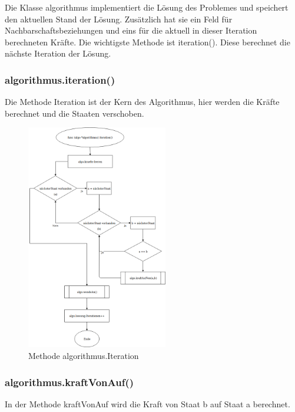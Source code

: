 Die Klasse algorithmus implementiert die Lösung des Problemes und speichert den aktuellen Stand der Lösung.
Zusätzlich hat sie ein Feld für Nachbarschaftsbeziehungen und eins für die aktuell in dieser Iteration berechneten Kräfte.
Die wichtigste Methode ist iteration(). Diese berechnet die nächste Iteration der Lösung.

\subsubsection{algorithmus.iteration()}
Die Methode Iteration ist der Kern des Algorithmus, hier werden die Kräfte berechnet und die Staaten verschoben.

\begin{figure}[h!]
    \centering
    \includegraphics[width=0.55\textwidth,]{Iteration.png}
    \caption[]{Methode algorithmus.Iteration}
\end{figure}

\pagebreak

\subsubsection{algorithmus.kraftVonAuf()}
In der Methode kraftVonAuf wird die Kraft von Staat b auf Staat a berechnet.

